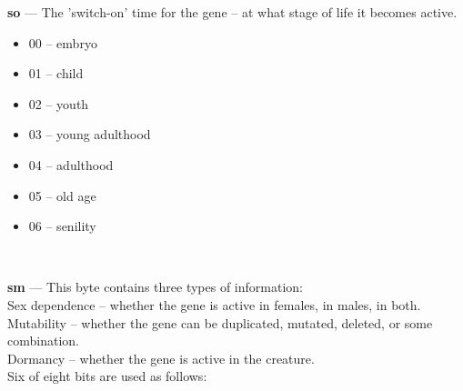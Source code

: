 \documentclass[11pt,twoside,a4paper]{article}
\begin{document}
\begin{minipage}[ht]{0.45\textwidth}
	\textbf{so} --- The 'switch-on' time for the gene -- at what stage of life it becomes active.
	\begin{itemize}
		\item 00 -- embryo
		\item 01 -- child
		\item 02 -- youth
		\item 03 -- young adulthood
		\item 04 -- adulthood
		\item 05 -- old age
		\item 06 -- senility 
	\end{itemize} ~\\
\end{minipage} \hfill \begin{minipage}[ht]{0.45\textwidth}	
	\textbf{sm} --- This byte contains three types of information: ~\\
		Sex dependence -- whether the gene is active in females, in males, in both. ~\\
		Mutability -- whether the gene can be duplicated, mutated, deleted, or some combination. ~\\
		Dormancy -- whether the gene is active in the creature.  ~\\
		
		Six of eight bits are used as follows: ~\\
\end{minipage} 
	
\end{document}
